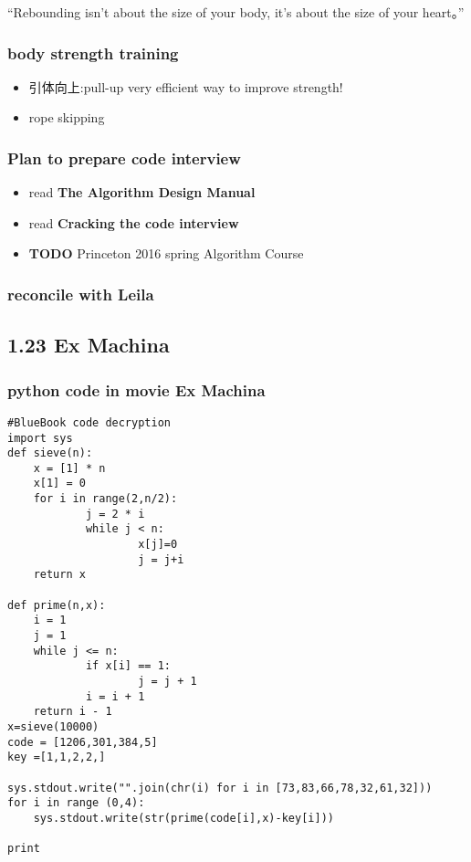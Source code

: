 \documentclass[11pt]{article}
\begin{document}
“Rebounding isn't about the size of your body, it's about the size of your heart。”

\subsubsection*{body strength training}
\label{sec:orgheadline41}
\begin{itemize}
\item 引体向上:pull-up
\label{sec:orgheadline39}
very efficient way to improve strength!
\item rope skipping
\label{sec:orgheadline40}
\end{itemize}

\subsubsection*{Plan to prepare code interview}
\label{sec:orgheadline45}

\begin{itemize}
\item read \textbf{The Algorithm Design Manual}
\label{sec:orgheadline42}

\item read \textbf{Cracking the code interview}
\label{sec:orgheadline43}

\item {\bfseries\sffamily TODO} Princeton 2016 spring Algorithm Course
\label{sec:orgheadline44}
\end{itemize}

\subsubsection*{reconcile with Leila}
\label{sec:orgheadline46}

\subsection*{1.23 Ex Machina}
\label{sec:orgheadline49}

\subsubsection*{python code in movie \textbf{Ex Machina}}
\label{sec:orgheadline48}
\begin{verbatim}
#BlueBook code decryption
import sys
def sieve(n):
    x = [1] * n
    x[1] = 0
    for i in range(2,n/2):
            j = 2 * i
            while j < n:
                    x[j]=0
                    j = j+i
    return x

def prime(n,x):
    i = 1
    j = 1
    while j <= n:
            if x[i] == 1:
                    j = j + 1
            i = i + 1
    return i - 1
x=sieve(10000)
code = [1206,301,384,5]
key =[1,1,2,2,]

sys.stdout.write("".join(chr(i) for i in [73,83,66,78,32,61,32]))
for i in range (0,4):
    sys.stdout.write(str(prime(code[i],x)-key[i]))

print
\end{verbatim}
\end{document}
